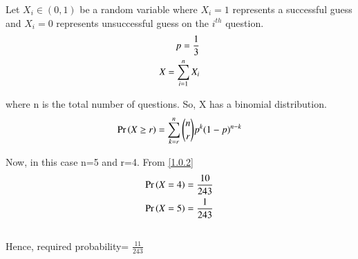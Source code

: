 Let $X_i \in (0,1)$ be a random variable where $X_i=1$ represents a successful guess and $X_i = 0$ represents unsuccessful guess on the $i^{th}$ question.\\
\begin{align}
 p=\frac{1}{3}  \notag \\
X= \sum_{i=1}^{n}X_{i} 
\end{align}

where n is the total number of questions. So, X has a binomial distribution.\\
\begin{align}
\Pr\left(X \geq r\right) = \sum_{k=r}^{n} \binom{n}{r}p^k(1-p)^{n-k} \label{1.0.2} 
\end{align}

Now, in this case n=5 and r=4. From \eqref{1.0.2}\\
\begin{align}
\Pr\left(X=4\right)=\frac{10}{243}  \notag \\ 
 \Pr\left(X=5\right)=\frac{1}{243}   \notag \\ 
 \notag
 \end{align}
Hence, required probability= $\frac{11}{243}$ 